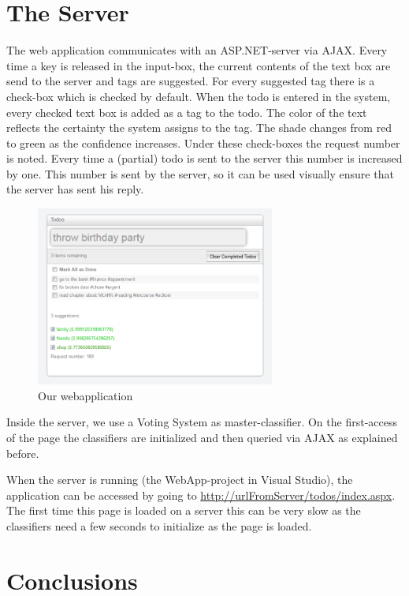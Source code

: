 \documentclass[a4paper,titlepage]{article}
\begin{document}
\section{The Server}
The web application communicates with an ASP.NET-server via AJAX. Every time a key is released in the input-box, the current contents of the text box are send to the server and tags are suggested. For every suggested tag there is a check-box which is checked by default. 
When the todo is entered in the system, every checked text box is added as a tag to the todo. The color of the text reflects the certainty the system assigns to the tag. The shade changes from red to green as the confidence increases. Under these check-boxes the request number is noted. Every time a (partial) todo is sent to the server this number is increased by one. This number is sent by the server, so it can be used visually ensure that the server has sent his reply.
\begin{figure} \centering \includegraphics[width=0.70\textwidth]{screenshot.PNG} \caption{Our webapplication} \end{figure}
Inside the server, we use a Voting System as master-classifier. On the first-access of the page the classifiers are initialized and then queried via AJAX as explained before. 

When the server is running (the WebApp-project in Visual Studio), the application can be accessed by going to \url{http://urlFromServer/todos/index.aspx}. The first time this page is loaded on a server this can be very slow as the classifiers need a few seconds to initialize as the page is loaded.

\section{Conclusions}
\end{document}

